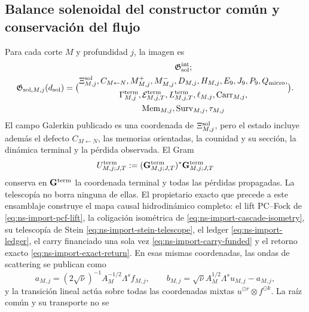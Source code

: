 \subsection{Balance solenoidal del constructor común y conservación del flujo}

Para cada corte $M$ y profundidad $j$, la imagen es
\begin{equation}\label{eq:pdf2-g-sol-explicito}
 \mathfrak G_{{\rm sol},M,j}(d_{\rm sol})=
 \bigl(
 \begin{gathered}
  \mathfrak G_{\rm sol}^{\rm int};\\
  \Xi_{M,j}^{\rm sol},C_{M\leftarrow N},M_{M,j}^+,M_{M,j}^-,
  D_{M,j},H_{M,j},E_9,J_9,P_9,Q_{\rm micro},\\
  \Gamma_{M,j}^{\rm term},\mathcal E_{M,j,T}^{\rm term},
  L_{M,j,T}^{\rm term},\ell_{M,j},\operatorname{Carr}_{M,j},\\
  \operatorname{Mem}_{M,j},\operatorname{Surv}_{M,j},\tau_{M,j}
 \end{gathered}
 \bigr).
\end{equation}
El campo Galerkin publicado es una coordenada de $\Xi_{M,j}^{\rm sol}$, pero el
estado incluye además el defecto $C_{M\leftarrow N}$, las memorias orientadas, la
counidad y su sección, la dinámica terminal y la pérdida observada. El Gram
\begin{equation}\label{eq:pdf2-g-sol-gram-estructural}
 U_{M,j;J,T}^{\rm term}
 :=(\mathbf G_{M,j;J,T}^{\rm term})^*
    \mathbf G_{M,j;J,T}^{\rm term}
\end{equation}
conserva en $\mathbf G^{\rm term}$ la coordenada terminal y todas las pérdidas
propagadas. La telescopía no borra ninguna de ellas.
El propietario exacto que precede a este ensamblaje construye el mapa causal
hidrodinámico completo: el lift PC--Fock de
\eqref{eq:ns-import-pcf-lift}, la coligación isométrica de
\eqref{eq:ns-import-cascade-isometry}, su telescopía de Stein
\eqref{eq:ns-import-stein-telescope}, el ledger
\eqref{eq:ns-import-ledger}, el carry financiado una sola vez
\eqref{eq:ns-import-carry-funded} y el retorno exacto
\eqref{eq:ns-import-exact-return}. En esas mismas coordenadas, las ondas de
scattering se publican como
\begin{equation}\label{eq:pdf2-g-sol-ondas-dato}
 a_{M,j}=(2\sqrt\nu)^{-1}A_M^{-1/2}\Lambda^sf_{M,j},
 \qquad
 b_{M,j}=\sqrt\nu A_M^{1/2}\Lambda^su_{M,j}-a_{M,j},
\end{equation}
y la transición lineal actúa sobre todas las coordenadas mixtas
$u^{\odot r}\otimes f^{\odot k}$. La raíz común y su transporte no se
